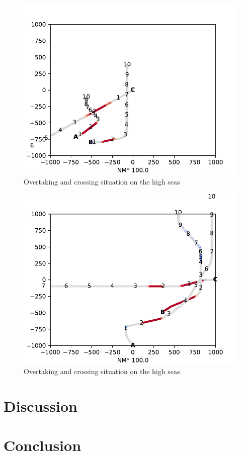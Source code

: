 \begin{figure}[H]
    \centering
    \includegraphics[width=\textwidth,height=0.75\textheight,keepaspectratio]{Figures/Scenario/overtaking-and-crossing-res.pdf}
    \caption{Overtaking and crossing situation on the high seas }
    \label{fig:overtaking-and-crossing}
\end{figure}
\begin{figure}[H]
    \centering
    \includegraphics[width=\textwidth,height=0.75\textheight,keepaspectratio]{Figures/Scenario/overtaking-and-crossing-2-res.pdf}
    \caption{Overtaking and crossing situation on the high seas }
    \label{fig:overtaking-and-crossing-2}
\end{figure}
\chapter{Discussion}
\chapter{Conclusion}